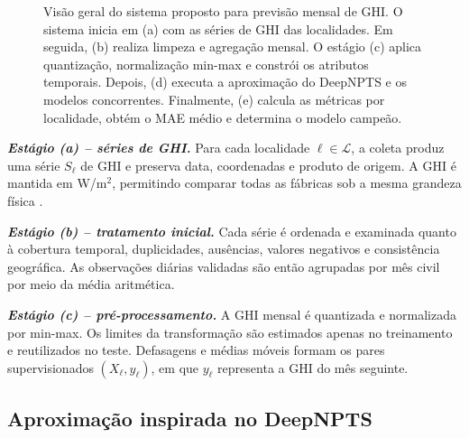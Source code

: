 \documentclass[11pt,a4paper]{article}
\begin{document}
\begin{figure}[htbp]
{%
}
\caption{Visão geral do sistema proposto para previsão mensal de GHI. O sistema inicia em (a) com as séries de GHI das localidades. Em seguida, (b) realiza limpeza e agregação mensal. O estágio (c) aplica quantização, normalização min-max e constrói os atributos temporais. Depois, (d) executa a aproximação do DeepNPTS e os modelos concorrentes. Finalmente, (e) calcula as métricas por localidade, obtém o MAE médio e determina o modelo campeão.}
\label{fig:sistema_deepnpts}
\end{figure}

\noindent\textbf{\textit{Estágio (a) -- séries de GHI.}} Para cada localidade $\ell\in\mathcal L$, a coleta produz uma série $S_{\ell}$ de GHI e preserva data, coordenadas e produto de origem. A GHI é mantida em W/m$^2$, permitindo comparar todas as fábricas sob a mesma grandeza física \cite{sengupta2018}.

\noindent\textbf{\textit{Estágio (b) -- tratamento inicial.}} Cada série é ordenada e examinada quanto à cobertura temporal, duplicidades, ausências, valores negativos e consistência geográfica. As observações diárias validadas são então agrupadas por mês civil por meio da média aritmética.

\noindent\textbf{\textit{Estágio (c) -- pré-processamento.}} A GHI mensal é quantizada e normalizada por min-max. Os limites da transformação são estimados apenas no treinamento e reutilizados no teste. Defasagens e médias móveis formam os pares supervisionados $(X_{\ell},y_{\ell})$, em que $y_{\ell}$ representa a GHI do mês seguinte.

\subsection{Aproximação inspirada no DeepNPTS}
\end{document}
